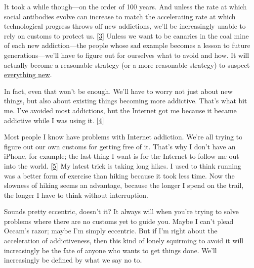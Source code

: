 It
                  took a while though---on the order of 100 years. And
                  unless the rate at which social antibodies evolve can increase
                  to match the accelerating rate at which technological progress
                  throws off new addictions, we'll be increasingly unable to
                  rely on customs to protect us.
                  [\href{\#f3n}{3}]
                  Unless we want to be canaries in the coal mine of each new
                  addiction---the people whose sad example becomes a lesson
                  to future generations---we'll have to figure out for
                  ourselves what to avoid and how. It will actually become a
                  reasonable strategy (or a more reasonable strategy) to suspect
                  \href{http://en.wikipedia.org/wiki/Paleolithic\_diet}{everything new}.

In fact, even that won't be enough. We'll have
                  to worry not just about new things, but also about existing
                  things becoming more addictive. That's what bit me. I've
                  avoided most addictions, but the Internet got me because it
                  became addictive while I was using it.
                  [\href{\#f4n}{4}]

Most people I know have problems with Internet
                  addiction. We're all trying to figure out our own customs for
                  getting free of it. That's why I don't have an iPhone, for
                  example; the last thing I want is for the Internet to follow
                  me out into the world.
                  [\href{\#f5n}{5}]
                  My latest trick is taking long hikes. I used to think running
                  was a better form of exercise than hiking because it took less
                  time. Now the slowness of hiking seems an advantage, because
                  the longer I spend on the trail, the longer I have to think
                  without interruption.

Sounds pretty eccentric,
                  doesn't it? It always will when you're trying to solve
                  problems where there are no customs yet to guide you. Maybe I
                  can't plead Occam's razor; maybe I'm simply eccentric. But if
                  I'm right about the acceleration of addictiveness, then this
                  kind of lonely squirming to avoid it will increasingly be the
                  fate of anyone who wants to get things done. We'll
                  increasingly be defined by what we say no to.








